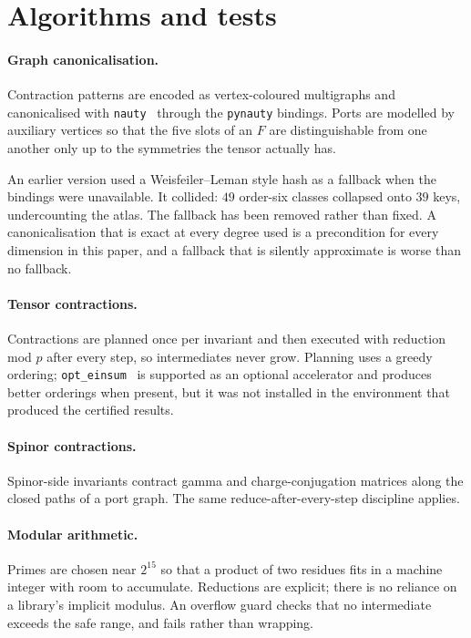 \section{Algorithms and tests}
\label{app:algorithms}

\paragraph{Graph canonicalisation.}
Contraction patterns are encoded as vertex-coloured multigraphs and canonicalised
with \texttt{nauty}~\cite{McKay:2013} through the \texttt{pynauty} bindings. Ports
are modelled by auxiliary vertices so that the five slots of an $F$ are
distinguishable from one another only up to the symmetries the tensor actually
has.

An earlier version used a Weisfeiler--Leman style hash as a fallback when the
bindings were unavailable. It collided: $49$ order-six classes collapsed onto
$39$ keys, undercounting the atlas. The fallback has been removed rather than
fixed. A canonicalisation that is exact at every degree used is a precondition for
every dimension in this paper, and a fallback that is silently approximate is
worse than no fallback.

\paragraph{Tensor contractions.}
Contractions are planned once per invariant and then executed with reduction mod
$p$ after every step, so intermediates never grow. Planning uses a greedy
ordering; \texttt{opt\_einsum}~\cite{Smith:2018} is supported as an optional
accelerator and produces better orderings when present, but it was not installed
in the environment that produced the certified results.

\paragraph{Spinor contractions.}
Spinor-side invariants contract gamma and charge-conjugation matrices along the
closed paths of a port graph. The same reduce-after-every-step discipline applies.

\paragraph{Modular arithmetic.}
Primes are chosen near $2^{15}$ so that a product of two residues fits in a
machine integer with room to accumulate. Reductions are explicit; there is no
reliance on a library's implicit modulus. An overflow guard checks that no
intermediate exceeds the safe range, and fails rather than wrapping.

